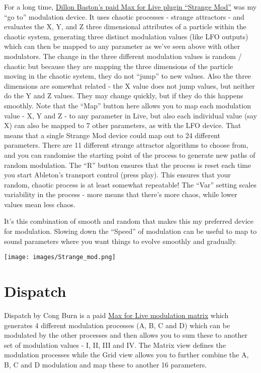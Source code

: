 \documentclass[
  12pt,
  letterpaper,
  oneside,
  open=any]{scrbook}
\begin{document}
For a long time,
\href{https://maxforlive.com/library/device/6872/strange-mod}{Dillon
Baston's paid Max for Live plugin ``Strange Mod''} was my ``go to''
modulation device. It uses chaotic processes - strange attractors - and
evaluates the X, Y, and Z three dimensional attributes of a particle
within the chaotic system, generating three distinct modulation values
(like LFO outputs) which can then be mapped to any parameter as we've
seen above with other modulators. The change in the three different
modulation values is random / chaotic but because they are mapping the
three dimensions of the particle moving in the chaotic system, they do
not ``jump'' to new values. Also the three dimensions are somewhat
related - the X value does not jump values, but neither do the Y and Z
values. They may change quickly, but if they do this happens smoothly.
Note that the ``Map'' button here allows you to map each modulation
value - X, Y and Z - to any parameter in Live, but also each individual
value (say X) can also be mapped to 7 other parameters, as with the LFO
device. That means that a single Strange Mod device could map out to 24
different parameters. There are 11 different strange attractor
algorithms to choose from, and you can randomise the starting point of
the process to generate new paths of random modulation. The ``R'' button
ensures that the process is reset each time you start Ableton's
transport control (press play). This ensures that your random, chaotic
process is at least somewhat repeatable! The ``Var'' setting scales
variability in the process - more means that there's more chaos, while
lower values mean less chaos.

It's this combination of smooth and random that makes this my preferred
device for modulation. Slowing down the ``Speed'' of modulation can be
useful to map to sound parameters where you want things to evolve
smoothly and gradually.

\texttt{[image: images/Strange\_mod.png]}

\section{Dispatch}\label{dispatch}

Dispatch by Cong Burn is a paid
\href{https://maxforlive.com/library/device/7361/dispatch-global-modulation-matrix}{Max
for Live modulation matrix} which generates 4 different modulation
processes (A, B, C and D) which can be modulated by the other processes
and then allows you to sum these to another set of modulation values -
I, II, III and IV. The Matrix view defines the modulation processes
while the Grid view allows you to further combine the A, B, C and D
modulation and map these to another 16 parameters.
\end{document}
